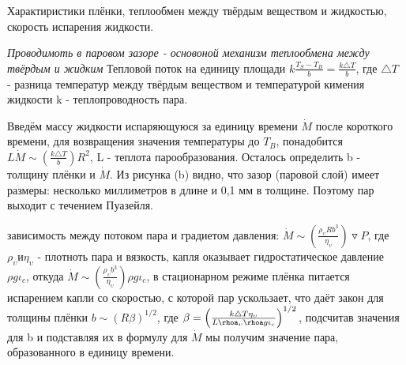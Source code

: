 \begin{frame}{Характиристики плёнки, теплообмен между твёрдым веществом и жидкостью, скорость испарения жидкости.}
\begin{block}{\sl Проводимоть в паровом зазоре - основоной механизм теплообмена между твёрдым и жидким}
Тепловой поток на единицу площади  \(k\frac{T_{S}-T_{B}}{b} = \frac{k\triangle T}{b}\), где \(\triangle T\) - разница температур между твёрдым веществом и температурой кимения жидкости k - теплопроводность пара.
\end{block}
Введём массу жидкости испаряющуюся за единицу времени \(\dot{M}\) после короткого времени, для возвращения значения температуры до \(T_{B}\), понадобится \(L\dot{M}\sim\left(\frac{k\triangle T}{b}\right)R^{2}\), L - теплота парообразования. Осталось определить b - толщину плёнки и \(\dot{M}\). Из рисунка ({b}) видно, что зазор (паровой слой) имеет размеры: несколько миллиметров в длине и 0,1 мм в толщине. Поэтому пар выходит с течением Пуазейля.
\end{frame}

\begin{frame}{}
\begin{block}{ зависимость между потоком пара и градиетом давления:}
\(\dot{M}\sim\left(\frac{\rho_{\upsilon}Rb^{3}}{\eta_{\upsilon}}\right)\triangledown P\), где \(\rho_{\upsilon} и \eta_{\upsilon}\) - плотноть пара и вязкость, капля оказывает гидростатическое давление \(\rho g\iota_{c}\), откуда \(\dot{M}\sim\left(\frac{\rho_{\upsilon}b^{3}}{\eta_{\upsilon}}\right)\rho g\iota_{c}\), в стационарном режиме плёнка питается испарением капли со скоростью, с которой пар ускользает, что даёт закон для толщины плёнки \(b\sim\left(R\beta\right)^{1/2}\), где \(\beta = {\left(\frac{k\triangle T\eta_{\upsilon}}{L\rhoa_{\upsilon}\rhoa g\iota_{c}}\right)}^{1/2}\), подсчитав значения для b и подставляя их в формулу для \(\dot{M}\) мы получим значение пара, образованного в единицу времени.
\end{block}
\end{frame}

